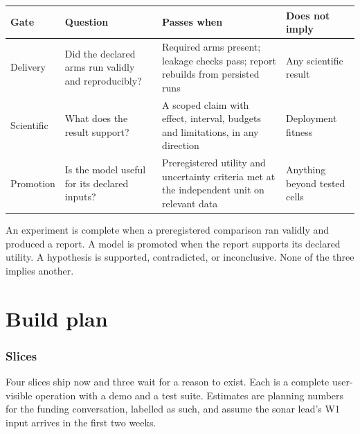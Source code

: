 \documentclass[11pt,a4paper]{article}
\begin{document}
\begin{center}\small
\begin{tabular}{@{}lp{4cm}p{5.2cm}p{3cm}@{}}
\toprule
Gate & Question & Passes when & Does not imply \\
\midrule
Delivery & Did the declared arms run validly and reproducibly? & Required arms present; leakage checks pass; report rebuilds from persisted runs & Any scientific result \\
Scientific & What does the result support? & A scoped claim with effect, interval, budgets and limitations, in any direction & Deployment fitness \\
Promotion & Is the model useful for its declared inputs? & Preregistered utility and uncertainty criteria met at the independent unit on relevant data & Anything beyond tested cells \\
\bottomrule
\end{tabular}
\end{center}
An experiment is complete when a preregistered comparison ran validly and produced a report. A model is promoted when the report supports its declared utility. A hypothesis is supported, contradicted, or inconclusive. None of the three implies another.

\part{Build plan}

\section{Slices}

Four slices ship now and three wait for a reason to exist. Each is a complete user-visible operation with a demo and a test suite. Estimates are planning numbers for the funding conversation, labelled as such, and assume the sonar lead's W1 input arrives in the first two weeks. \tagP{}
\end{document}
